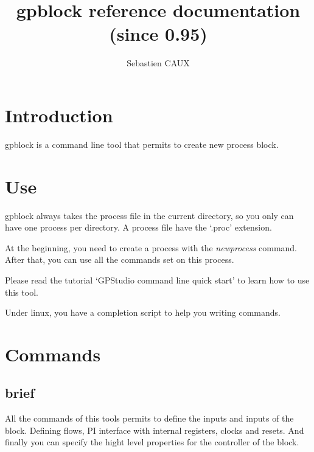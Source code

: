 \documentclass[10pt,a4paper]{article}
\author{Sebastien CAUX}
\title{gpblock reference documentation \version \\ (since 0.95)}
\begin{document}
\maketitle
\section{Introduction}
gpblock is a command line tool that permits to create new process block.

\section{Use}
gpblock always takes the process file in the current directory, so you only can have one process per directory. A process file have the `.proc' extension.

At the beginning, you need to create a process with the \emph{newprocess} command. After that, you can use all the commands set on this process.

Please read the tutorial `GPStudio command line quick start' to learn how to use this tool.

Under linux, you have a completion script to help you writing commands.

\section{Commands}
\subsection{brief}
All the commands of this tools permits to define the inputs and inputs of the block. Defining flows, PI interface with internal registers, clocks and resets. And finally you can specify the hight level properties for the controller of the block.
\end{document}
